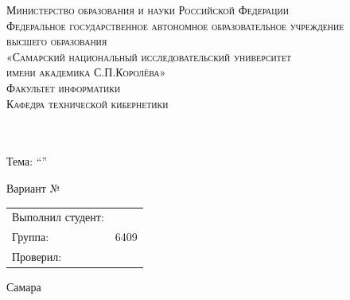 \begin{titlepage}
							
	\center
							
							
	\textsc{Министерство образования и науки Российской Федерации}\\[-0.15cm]
	\textsc{Федеральное государственное автономное образовательное учреждение \\[-0.15cm] высшего образования}\\[-0.15cm] 
	\textsc{«Самарский национальный исследовательский университет \\[-0.15cm] имени академика С.П.Королёва»}\\[0.25cm]
	\textsc{Факультет информатики}\\[0.1cm]
	\textsc{Кафедра технической кибернетики}\\[0.5cm]
						
							
	\vfill\vfill
						    
							
	{\large \textbf{\subjectTitle}}\\[0.3cm]
	
	{\large \taskTitle}\\[0.5cm]
						  
    {\large Тема: \enquote{\textbf{\theme}}}\\[0.5cm]

    \vfill
    
   {Вариант № \variantNumber}\\[0.5cm]


	\vfill\vfill
							
	\begin{minipage}{1\textwidth}
		\begin{center}
			\begin{tabularx}{\textwidth}{X l}
				Выполнил студент:        & \firstAuthorSurName \firstAuthorInitials \\
				Группа:                    & 6409                     		           \\
				Проверил:                  & \teacherName         		                \\
			\end{tabularx}
		\end{center}
	\end{minipage}
							
						
							
	\vfill\vfill\vfill
					
	{\centering Самара \the\year}
							
							
\end{titlepage}

